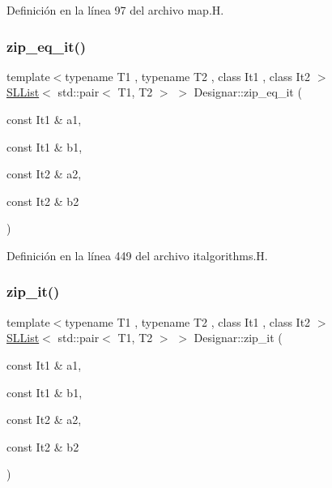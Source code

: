 Definición en la línea 97 del archivo map.\+H.

\mbox{\label{namespace_designar_a03bdb23b13b2aed29e869046d99e5bc6}} 
\subsubsection{\texorpdfstring{zip\+\_\+eq\+\_\+it()}{zip\_eq\_it()}}
{\footnotesize\ttfamily template$<$typename T1 , typename T2 , class It1 , class It2 $>$ \\
\hyperlink{class_designar_1_1_s_l_list}{S\+L\+List}$<$ std\+::pair$<$ T1, T2 $>$ $>$ Designar\+::zip\+\_\+eq\+\_\+it (\begin{DoxyParamCaption}\item[{const It1 \&}]{a1,  }\item[{const It1 \&}]{b1,  }\item[{const It2 \&}]{a2,  }\item[{const It2 \&}]{b2 }\end{DoxyParamCaption})}



Definición en la línea 449 del archivo italgorithms.\+H.

\mbox{\label{namespace_designar_a16eafe2daeba2559854cb96696a48f59}} 
\subsubsection{\texorpdfstring{zip\+\_\+it()}{zip\_it()}}
{\footnotesize\ttfamily template$<$typename T1 , typename T2 , class It1 , class It2 $>$ \\
\hyperlink{class_designar_1_1_s_l_list}{S\+L\+List}$<$ std\+::pair$<$ T1, T2 $>$ $>$ Designar\+::zip\+\_\+it (\begin{DoxyParamCaption}\item[{const It1 \&}]{a1,  }\item[{const It1 \&}]{b1,  }\item[{const It2 \&}]{a2,  }\item[{const It2 \&}]{b2 }\end{DoxyParamCaption})}



